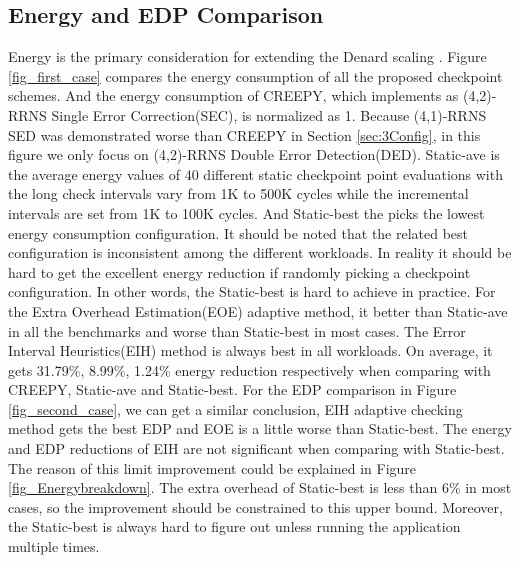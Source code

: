 \documentclass{sig-alternate}
\begin{document}
\subsection{Energy and EDP Comparison}
Energy is the primary consideration for extending the Denard scaling \cite{Dennard}. Figure \ref{fig_first_case} compares the energy consumption of all the proposed checkpoint schemes. And the energy consumption of CREEPY, which implements as (4,2)-RRNS Single Error Correction(SEC), is normalized as 1. Because (4,1)-RRNS SED was demonstrated worse than CREEPY in Section \ref{sec:3Config}, in this figure we only focus on (4,2)-RRNS Double Error Detection(DED). Static-ave is the average energy values of 40 different static checkpoint point evaluations with the long check intervals vary from 1K to 500K cycles while the incremental intervals are set from 1K to 100K cycles. And Static-best the picks the lowest energy consumption configuration. It should be noted that the related best configuration is inconsistent among the different workloads. In reality it should be hard to get the excellent energy reduction if  randomly picking a checkpoint configuration. In other words, the Static-best is hard to achieve in practice. For the Extra Overhead Estimation(EOE) adaptive method, it better than Static-ave in all the benchmarks and worse than Static-best in most cases. The Error Interval Heuristics(EIH) method is always best in all workloads. On average, it gets 31.79\%,  8.99\%,  1.24\% energy reduction respectively when comparing with CREEPY, Static-ave and Static-best. For the EDP comparison in Figure \ref{fig_second_case}, we can get a similar conclusion, EIH adaptive checking method gets the best EDP and EOE is a little worse than Static-best. The energy and EDP reductions of EIH are not significant when comparing with Static-best. The reason of this limit improvement could be explained in Figure \ref{fig_Energybreakdown}. The extra overhead of Static-best is less than 6\% in most cases, so the improvement should be constrained to this upper bound. Moreover, the Static-best is always hard to figure out unless running the application multiple times. 
\end{document}
